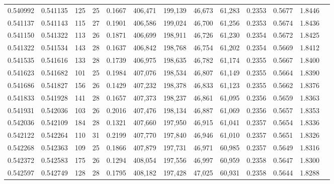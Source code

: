 \begin{tabular}{rrrrrrrrrrrrr}
0.540992 & 0.541135 &   125 &  25 &                                     0.1667 & 406,471 & 199,139 &  46,673 &  61,283 & 0.2353 & 0.5677 & 1.8446 \\
0.541137 & 0.541143 &   115 &  27 &                                     0.1901 & 406,586 & 199,024 &  46,700 &  61,256 & 0.2353 & 0.5674 & 1.8436 \\
0.541150 & 0.541322 &   113 &  26 &                                     0.1871 & 406,699 & 198,911 &  46,726 &  61,230 & 0.2354 & 0.5672 & 1.8425 \\
0.541322 & 0.541534 &   143 &  28 &                                     0.1637 & 406,842 & 198,768 &  46,754 &  61,202 & 0.2354 & 0.5669 & 1.8412 \\
0.541535 & 0.541616 &   133 &  28 &                                     0.1739 & 406,975 & 198,635 &  46,782 &  61,174 & 0.2355 & 0.5667 & 1.8400 \\
0.541623 & 0.541682 &   101 &  25 &                                     0.1984 & 407,076 & 198,534 &  46,807 &  61,149 & 0.2355 & 0.5664 & 1.8390 \\
0.541686 & 0.541827 &   156 &  26 &                                     0.1429 & 407,232 & 198,378 &  46,833 &  61,123 & 0.2355 & 0.5662 & 1.8376 \\
0.541833 & 0.541928 &   141 &  28 &                                     0.1657 & 407,373 & 198,237 &  46,861 &  61,095 & 0.2356 & 0.5659 & 1.8363 \\
0.541931 & 0.542036 &   103 &  26 &                                     0.2016 & 407,476 & 198,134 &  46,887 &  61,069 & 0.2356 & 0.5657 & 1.8353 \\
0.542036 & 0.542109 &   184 &  28 &                                     0.1321 & 407,660 & 197,950 &  46,915 &  61,041 & 0.2357 & 0.5654 & 1.8336 \\
0.542122 & 0.542264 &   110 &  31 &                                     0.2199 & 407,770 & 197,840 &  46,946 &  61,010 & 0.2357 & 0.5651 & 1.8326 \\
0.542268 & 0.542363 &   109 &  25 &                                     0.1866 & 407,879 & 197,731 &  46,971 &  60,985 & 0.2357 & 0.5649 & 1.8316 \\
0.542372 & 0.542583 &   175 &  26 &                                     0.1294 & 408,054 & 197,556 &  46,997 &  60,959 & 0.2358 & 0.5647 & 1.8300 \\
0.542597 & 0.542749 &   128 &  28 &                                     0.1795 & 408,182 & 197,428 &  47,025 &  60,931 & 0.2358 & 0.5644 & 1.8288 \\

\end{tabular}
